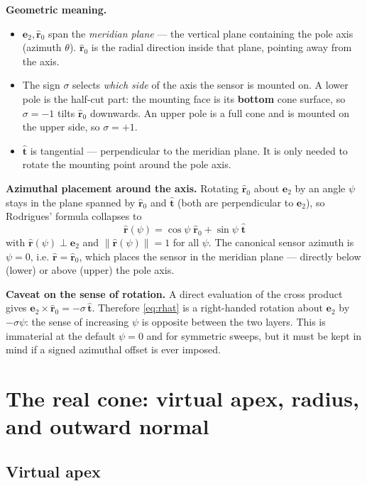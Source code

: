 \documentclass[12pt]{article}
\newcommand{\ehat}[1]{\mathbf{e}_{#1}}
\newcommand{\rhat}{\hat{\mathbf{r}}}
\newcommand{\that}{\hat{\mathbf{t}}}
\begin{document}
\textbf{Geometric meaning.}
\begin{itemize}\itemsep2pt
\item $\ehat{2},\rhat_0$ span the \emph{meridian plane} --- the vertical plane
      containing the pole axis (azimuth $\theta$). $\rhat_0$ is the radial direction
      inside that plane, pointing away from the axis.
\item The sign $\sigma$ selects \emph{which side} of the axis the sensor is mounted on.
      A lower pole is the half-cut part: the mounting face is its \textbf{bottom} cone
      surface, so $\sigma=-1$ tilts $\rhat_0$ downwards. An upper pole is a full cone
      and is mounted on the upper side, so $\sigma=+1$.
\item $\that$ is tangential --- perpendicular to the meridian plane. It is only needed
      to rotate the mounting point around the pole axis.
\end{itemize}

\textbf{Azimuthal placement around the axis.} Rotating $\rhat_0$ about $\ehat{2}$ by an
angle $\psi$ stays in the plane spanned by $\rhat_0$ and $\that$ (both are
perpendicular to $\ehat{2}$), so Rodrigues' formula collapses to
\begin{equation}
\boxed{\ \rhat(\psi)=\cos\psi\;\rhat_0+\sin\psi\;\that\ }
\label{eq:rhat}
\end{equation}
with $\rhat(\psi)\perp\ehat{2}$ and $\|\rhat(\psi)\|=1$ for all $\psi$. The canonical
sensor azimuth is $\psi=0$, i.e. $\rhat=\rhat_0$, which places the sensor in the
meridian plane --- directly below (lower) or above (upper) the pole axis.

\textbf{Caveat on the sense of rotation.} A direct evaluation of the cross product
gives $\ehat{2}\times\rhat_0=-\sigma\,\that$. Therefore \eqref{eq:rhat} is a
right-handed rotation about $\ehat{2}$ by $-\sigma\psi$: the sense of increasing $\psi$
is opposite between the two layers. This is immaterial at the default $\psi=0$ and for
symmetric sweeps, but it must be kept in mind if a signed azimuthal offset is ever
imposed.

\section{The real cone: virtual apex, radius, and outward normal}

\subsection{Virtual apex}
\end{document}
